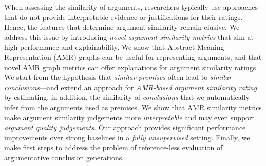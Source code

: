 When assessing the similarity of arguments, researchers typically use approaches that do not provide interpretable evidence or justifications for their ratings. Hence, the features that determine argument similarity remain elusive. We address this issue by introducing \textit{novel argument similarity metrics} that aim at high performance and explainability. We show that Abstract Meaning Representation (AMR) graphs can be useful for representing arguments, and that novel AMR graph metrics can offer explanations for argument similarity ratings. We start from the hypothesis that \textit{similar premises} often lead to \textit{similar conclusions}---and extend an approach for \textit{AMR-based argument similarity rating} by estimating, in addition, the similarity of \textit{conclusions} that we automatically infer from the arguments used as premises. We show that AMR similarity metrics make argument similarity judgements more \textit{interpretable} and may even support \textit{argument quality judgements}. Our approach provides significant performance improvements over strong baselines in a \textit{fully unsupervised} setting. Finally, we make first steps to address the problem of reference-less evaluation of argumentative conclusion generations.
